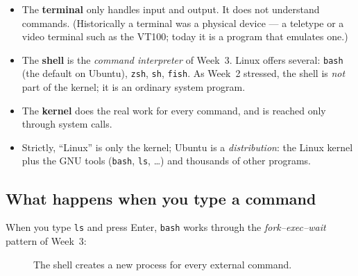 \documentclass[11pt,a4paper]{article}
\newcommand{\term}[1]{\textbf{\color{mintdeep}#1}}
\newcommand{\cmd}[1]{\texttt{#1}}
\begin{document}
\begin{itemize}
  \item The \term{terminal} only handles input and output. It does not understand commands. (Historically a terminal was a physical device --- a teletype or a video terminal such as the VT100; today it is a program that emulates one.)
  \item The \term{shell} is the \emph{command interpreter} of Week~3. Linux offers several: \cmd{bash} (the default on Ubuntu), \cmd{zsh}, \cmd{sh}, \cmd{fish}. As Week~2 stressed, the shell is \emph{not} part of the kernel; it is an ordinary system program.
  \item The \term{kernel} does the real work for every command, and is reached only through system calls.
  \item Strictly, ``Linux'' is only the kernel; Ubuntu is a \emph{distribution}: the Linux kernel plus the GNU tools (\cmd{bash}, \cmd{ls}, \ldots) and thousands of other programs.
\end{itemize}

\subsection{What happens when you type a command}
\label{sec:forkexec}

When you type \cmd{ls} and press Enter, \cmd{bash} works through the \emph{fork--exec--wait} pattern of Week~3:

\begin{figure}[H]
\centering
{}
\caption{The shell creates a new process for every external command.}
\end{figure}
\end{document}
